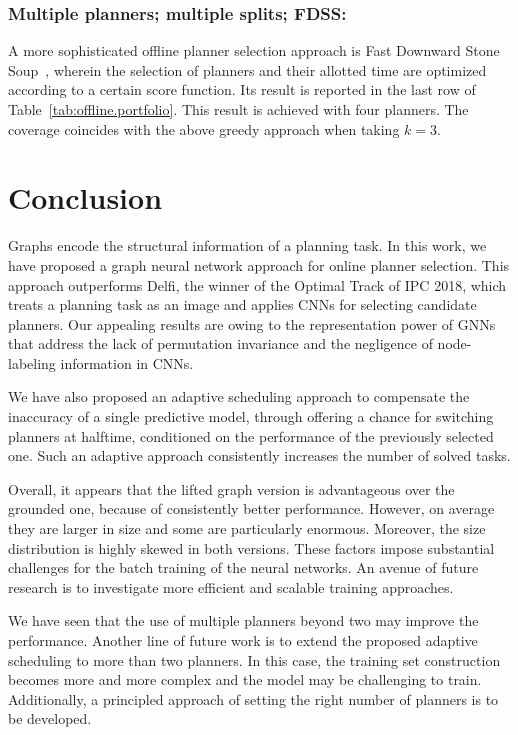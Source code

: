 \documentclass[letterpaper]{article} %
\begin{document}
\subsubsection{Multiple planners; multiple splits; FDSS:} A more sophisticated offline planner selection approach is Fast Downward Stone Soup~\cite{helmert-et-al-ipc2011}, wherein the selection of planners and their allotted time are optimized according to a certain score function. Its result is reported in the last row of Table~\ref{tab:offline.portfolio}. This result is achieved with four planners. The coverage coincides with the above greedy approach when taking $k=3$.


\section{Conclusion}
Graphs encode the structural information of a planning task. In this work, we have proposed a graph neural network approach for online planner selection. This approach outperforms Delfi, the winner of the Optimal Track of IPC 2018, which treats a planning task as an image and applies CNNs for selecting candidate planners. Our appealing results are owing to the representation power of GNNs that address the lack of permutation invariance and the negligence of node-labeling information in CNNs.

We have also proposed an adaptive scheduling approach to compensate the inaccuracy of a single predictive model, through offering a  chance for switching planners at halftime, conditioned on the performance of the previously selected one. Such an adaptive approach consistently increases the number of solved tasks.

Overall, it appears that the lifted graph version is advantageous over the grounded one, because of consistently better performance. However, on average they are larger in size and some are particularly enormous. Moreover, the size distribution is highly skewed in both versions. These factors impose substantial challenges for the batch training of the neural networks. An avenue of future research is to investigate more efficient and scalable training approaches.

We have seen that the use of multiple planners beyond two may improve the performance. Another line of future work is to extend the proposed adaptive scheduling to more than two planners. In this case, the training set construction becomes more and more complex and the model may be challenging to train. Additionally, a principled approach of setting the right number of planners is to be developed.
\end{document}
